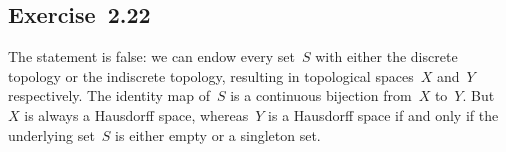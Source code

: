 \subsection{Exercise~2.22}

The statement is false:
we can endow every set~$S$ with either the discrete topology or the indiscrete topology, resulting in topological spaces~$X$ and~$Y$ respectively.
The identity map of~$S$ is a continuous bijection from~$X$ to~$Y$.
But~$X$ is always a Hausdorff space, whereas~$Y$ is a Hausdorff space if and only if the underlying set~$S$ is either empty or a singleton set.
